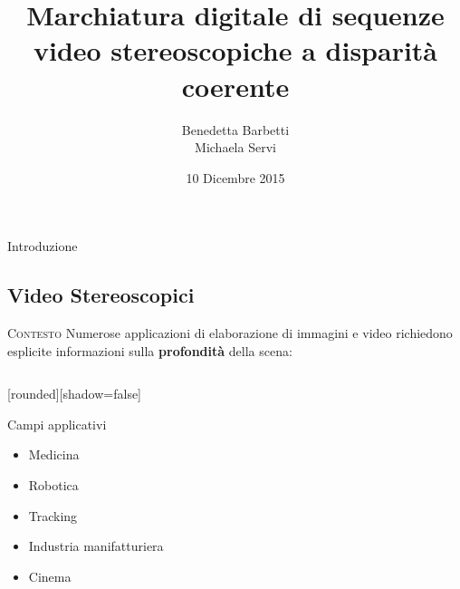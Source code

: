 \documentclass{beamer}
\title{Marchiatura digitale di sequenze video stereoscopiche a disparit\`{a} coerente}
\author{Benedetta Barbetti\\ 
		Michaela Servi}
\institute{Universit\`{a} degli studi di Firenze}
\date{10 Dicembre 2015}
\begin{document}
\begin{frame}
\titlepage
\end{frame}

\begin{section}{Introduzione}
\subsection{Video Stereoscopici}

\begin{frame}[t]{\textsc{Contesto}}
Numerose applicazioni di elaborazione di immagini e video richiedono esplicite informazioni sulla \textbf{profondit\`{a}} della scena:
\setlength{\columnsep}{0cm}
\begin{columns}
\begin{column}{4cm}
\begin{center}
[rounded][shadow=false]
\begin{block}{Campi applicativi}
		\begin{itemize}
			\item \small{Medicina} 
			\item Robotica
			\item Tracking
			\item Industria manifatturiera
			\item Cinema
		\end{itemize}	
	\end{block}
	


\end{center}
\end{column}
\end{columns}
\end{frame}
\end{section}
\end{document}
